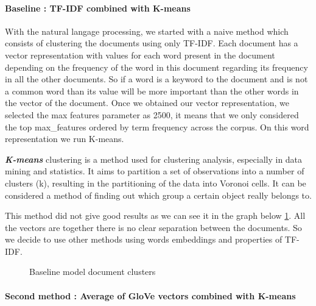 \documentclass[article,twocolumn]{IEEEtran}
\begin{document}
\hypertarget{baseline-tf-idf-combined-with-k-means}{%
\paragraph{Baseline : TF-IDF combined with
K-means}\label{baseline-tf-idf-combined-with-k-means}}

With the natural langage processing, we started with a naive method
which consists of clustering the documents using only TF-IDF. Each
document has a vector representation with values for each word present
in the document depending on the frequency of the word in this document
regarding its frequency in all the other documents. So if a word is a
keyword to the document and is not a common word than its value will be
more important than the other words in the vector of the document. Once
we obtained our vector representation, we selected the max features
parameter as 2500, it means that we only considered the top
max\_features ordered by term frequency across the corpus. On this word
representation we run K-means.

\textbf{\emph{K-means}} clustering is a method used for clustering
analysis, especially in data mining and statistics. It aims to partition
a set of observations into a number of clusters (k), resulting in the
partitioning of the data into Voronoi cells. It can be considered a
method of finding out which group a certain object really belongs to.

This method did not give good results as we can see it in the graph
below \ref{fig3}. All the vectors are together there is no clear
separation between the documents. So we decide to use other methods
using words embeddings and properties of TF-IDF.


    \begin{figure}
        \begin{center}\end{center}
        \caption{Baseline model document clusters}
        \label{fig3}
    \end{figure}
    
    \hypertarget{second-method-average-of-glove-vectors-combined-with-k-means}{%
\paragraph{Second method : Average of GloVe vectors combined with
K-means}\label{second-method-average-of-glove-vectors-combined-with-k-means}}
\end{document}
